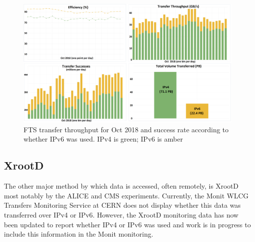 \begin{figure}[t]
\centering
\includegraphics[width=13cm]{FTS-IPv6-figure-revised.png}
\caption{FTS transfer throughput for Oct 2018 and success rate according to whether IPv6 was used. IPv4 is green; IPv6 is amber}
\label{fig:fts}
\end{figure}

\subsection{XrootD}
The other major method by which data is accessed, often remotely, is XrootD\cite{xrootd} most notably by the ALICE and CMS experiments. Currently, the Monit WLCG Transfers Monitoring Service at CERN %
does not display whether this data was transferred over IPv4 or IPv6. However, the XrootD monitoring data has now been updated to report whether IPv4 or IPv6 was used %
and work is in progress to include this information in the Monit monitoring.



